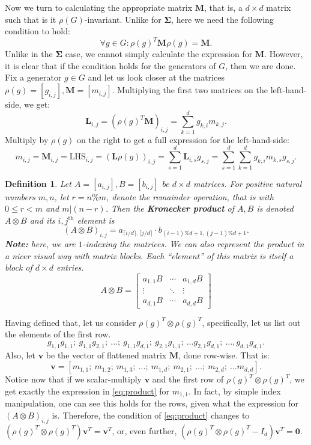 \documentclass[11pt]{article}
\newtheorem{definition}[theorem]{Definition}
\begin{document}
Now we turn to calculating the appropriate matrix $\mathbf{M}$, that is, a $d\times d$
matrix such that is it $\rho(G)$-invariant.
Unlike for $\mathbf{\Sigma}$, here we need the following condition to hold:
\[\forall g \in G: \rho(g)^T\mathbf{M}\rho(g) = \mathbf{M}. \label{eq:m_require}\tag{$\dagger$}\]
Unlike in the $\mathbf{\Sigma}$ case, we cannot simply calculate the expression for $\mathbf{M}$.
However, it is clear that if the condition holds for the generators of $G$, then we are done.
Fix a generator $g \in G$ and let us look closer at the matrices $\rho(g) = [g_{i,j}], \mathbf{M} = [m_{i,j}]$.
Multiplying the first two matrices on the left-hand-side, we get:
\[\mathbf{L}_{i,j} = (\rho(g)^T\mathbf{M})_{i,j} = \sum_{k=1}^{d}g_{k,i}m_{k,j}.\]
Multiply by $\rho(g)$ on the right to get a full expression for the left-hand-side:
\[m_{i,j} = \mathbf{M}_{i,j} = \text{LHS}_{i,j} = (\mathbf{L}\rho(g))_{i,j} =
\sum_{s=1}^{d}\mathbf{L}_{i,s}g_{s,j} = \sum_{s=1}^{d}\sum_{k=1}^{d}g_{k,i}m_{k,s}g_{s,j}. \label{eq:product} \tag{$\heartsuit$}\]
\begin{definition}
  Let $A = [a_{i,j}], B = [b_{i,j}]$ be $d\times d$ matrices. For positive natural numbers $m,n$, let
  $r = n \% m$, denote the remainder operation, that is with $0 \leq r < m$ and $m|(n-r)$.
  Then the \textbf{Kronecker product} of $A, B$ is denoted $A \otimes B$ and its
  $i,j^\text{th}$ element is \[(A \otimes B)_{i,j} = a_{\lceil i/d \rceil, \lceil j/d \rceil}\cdot b_{(i-1)\%d+1,(j-1)\%d+1}.\]
  \textbf{Note:} here, we are $1$-indexing the matrices.
  We can also represent the product in a nicer visual way with matrix blocks. Each ``element'' of this matrix is itself a block of $d\times d$ entries.
  \[A \otimes B = \begin{bmatrix} a_{1,1}B & \cdots & a_{1,d}B\\ \vdots & \ddots & \vdots \\ a_{d,1}B & \cdots & a_{d,d}B\end{bmatrix}\]
\end{definition}
Having defined that, let us consider $\rho(g)^T \otimes \rho(g)^T$, specifically, let us list out the elements of the first row.
\[g_{1,1}g_{1,1};~g_{1,1}g_{2,1};~\ldots;~g_{1,1}g_{d,1};~g_{2,1}g_{1,1};~\ldots g_{2,1}g_{d,1};~\ldots, g_{d,1}g_{d,1}.\]
Also, let $\mathbf{v}$ be the vector of flattened matrix $\mathbf{M}$, done row-wise. That is:
\[\mathbf{v} = [m_{1,1};~ m_{1,2};~ m_{1,3};~ \ldots;~ m_{1,d};~ m_{2,1};~ \ldots;~ m_{2,d};~ \ldots m_{d,d}].\]
Notice now that if we scalar-multiply $\mathbf{v}$ and the first row of $\rho(g)^T \otimes \rho(g)^T$, we get exactly
the expression in \cref{eq:product} for $m_{1,1}$. In fact, by simple index manipulation, one
can see this holds for the rows, given what the expression for $(A \otimes B)_{i,j}$ is.
Therefore, the condition of \cref{eq:product} changes to $\left(\rho(g)^T \otimes \rho(g)^T\right)\mathbf{v}^T = \mathbf{v}^T$,
or, even further, $\left(\rho(g)^T \otimes \rho(g)^T - I_d\right)\mathbf{v}^T = \mathbf{0}$.
\end{document}
